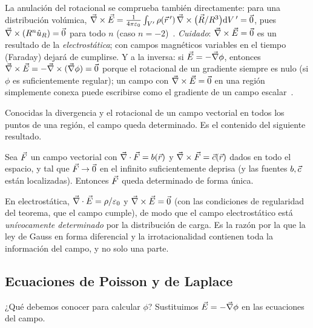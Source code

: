 \begin{observacion}\label{obs:rotacional}
La anulación del rotacional se comprueba también directamente: para una distribución volúmica,
$\vec{\nabla}\times\vec{E}=\frac{1}{4\pi\varepsilon_{0}}\int_{V'}\rho(\vec{r}\,')\,\vec{\nabla}\times\bigl(\vec{R}/R^{3}\bigr)\mathrm{d} V\,'=\vec{0}$, pues
$\vec{\nabla}\times(R^{n}\hat{u}_{R})=\vec{0}$ para todo $n$ (caso $n=-2$)~\cite{TEMA0}. \emph{Cuidado}: $\vec{\nabla}\times\vec{E}=\vec{0}$ es un resultado de la
\emph{electrostática}; con campos magnéticos variables en el tiempo (Faraday) dejará de cumplirse. Y a la inversa: si $\vec{E}=-\vec{\nabla}\phi$, entonces
$\vec{\nabla}\times\vec{E}=-\vec{\nabla}\times(\vec{\nabla}\phi)=\vec{0}$ porque el rotacional de un gradiente siempre es nulo (si $\phi$ es suficientemente regular);
un campo con $\vec{\nabla}\times\vec{E}=\vec{0}$ en una región simplemente conexa puede escribirse como el gradiente de un campo escalar~\cite{TEMA0}.
\end{observacion}

Conocidas la divergencia y el rotacional de un campo vectorial en todos los puntos de una región, el campo queda determinado. Es el contenido
del siguiente resultado.

\begin{teorema}\label{teo:helmholtz}
Sea $\vec{F}$ un campo vectorial con $\vec{\nabla}\cdot\vec{F}=b(\vec{r})$ y $\vec{\nabla}\times\vec{F}=\vec{c}(\vec{r})$ dados en todo el espacio, y tal que $\vec{F}\to\vec{0}$
en el infinito suficientemente deprisa (y las fuentes $b,\vec{c}$ están localizadas). Entonces $\vec{F}$ queda determinado de forma única.
\end{teorema}

En electrostática, $\vec{\nabla}\cdot\vec{E}=\rho/\varepsilon_{0}$ y $\vec{\nabla}\times\vec{E}=\vec{0}$ (con las condiciones de regularidad del teorema, que el campo cumple), de modo que el
campo electrostático está \emph{unívocamente determinado} por la distribución de carga. Es la razón por la que la ley de Gauss en forma diferencial y la
irrotacionalidad contienen toda la información del campo, y no solo una parte.

\subsection{Ecuaciones de Poisson y de Laplace}\label{sec:poisson}
¿Qué debemos conocer para calcular $\phi$? Sustituimos $\vec{E}=-\vec{\nabla}\phi$ en las ecuaciones del campo.

